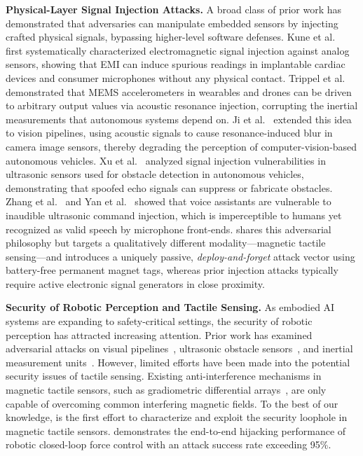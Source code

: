 \noindent\textbf{Physical-Layer Signal Injection Attacks.} 
A broad class of prior work has demonstrated that adversaries can manipulate embedded sensors by injecting crafted physical signals, bypassing higher-level software defenses.
Kune et al.~\cite{kune2013ghost} first systematically characterized electromagnetic signal injection against analog sensors, showing that EMI can induce spurious readings in implantable cardiac devices and consumer microphones without any physical contact.
Trippel et al.~\cite{trippel2017walnut} demonstrated that MEMS accelerometers in wearables and drones can be driven to arbitrary output values via acoustic resonance injection, corrupting the inertial measurements that autonomous systems depend on.
Ji et al.~\cite{ji2021poltergeist} extended this idea to vision pipelines, using acoustic signals to cause resonance-induced blur in camera image sensors, thereby degrading the perception of computer-vision-based autonomous vehicles.
Xu et al.~\cite{xu2018analyzing} analyzed signal injection vulnerabilities in ultrasonic sensors used for obstacle detection in autonomous vehicles, demonstrating that spoofed echo signals can suppress or fabricate obstacles.
Zhang et al.~\cite{zhang2017dolphinattack} and Yan et al.~\cite{yan2019feasibility} showed that voice assistants are vulnerable to inaudible ultrasonic command injection, which is imperceptible to humans yet recognized as valid speech by microphone front-ends.
{\name} shares this adversarial philosophy but targets a qualitatively different modality---magnetic tactile sensing---and introduces a uniquely passive, \emph{deploy-and-forget} attack vector using battery-free permanent magnet tags, whereas prior injection attacks typically require active electronic signal generators in close proximity.

\noindent\textbf{Security of Robotic Perception and Tactile Sensing.}
As embodied AI systems are expanding to safety-critical settings, the security of robotic perception has attracted increasing attention. 
Prior work has examined adversarial attacks on visual pipelines~\cite{ji2021poltergeist}, ultrasonic obstacle sensors~\cite{xu2018analyzing}, and inertial measurement units~\cite{trippel2017walnut}.
However, limited efforts have been made into the potential security issues of tactile sensing.
Existing anti-interference mechanisms in magnetic tactile sensors, such as gradiometric differential arrays~\cite{le2022gradiometric}, are only capable of overcoming common interfering magnetic fields. 
To the best of our knowledge, {\name} is the first effort to characterize and exploit the security loophole in magnetic tactile sensors. 
{\name} demonstrates the end-to-end hijacking performance of robotic closed-loop force control with an attack success rate exceeding 95\%.
